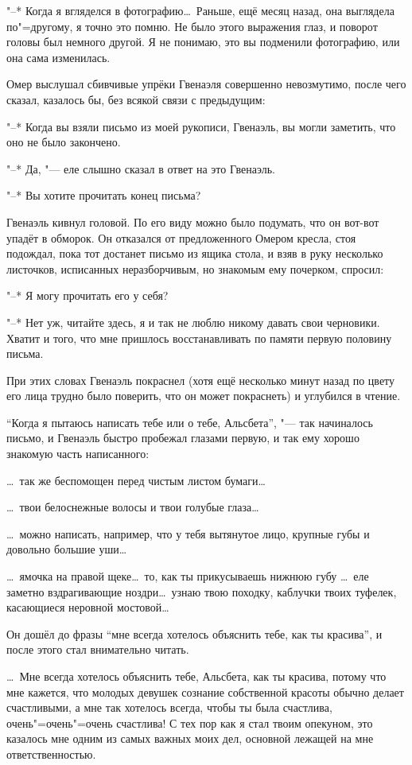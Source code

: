 "--* Когда я вгляделся в фотографию\ldots\
Раньше, ещё месяц назад, она выглядела по"=другому, я точно это помню.
Не было этого выражения глаз, и поворот головы был немного другой.
Я не понимаю, это вы подменили фотографию, или она сама изменилась.

Омер выслушал сбивчивые упрёки Гвенаэля совершенно невозмутимо, после чего
сказал, казалось бы, без всякой связи с предыдущим:

"--* Когда вы взяли письмо из моей рукописи, Гвенаэль, вы могли заметить, что
оно не было закончено.

"--* Да, "--- еле слышно сказал в ответ на это Гвенаэль.

"--* Вы хотите прочитать конец письма?

Гвенаэль кивнул головой.
По его виду можно было подумать, что он вот-вот упадёт в обморок.
Он отказался от предложенного Омером кресла, стоя подождал, пока тот достанет
письмо из ящика стола, и взяв в руку несколько листочков, исписанных
неразборчивым, но знакомым ему почерком, спросил:

"--* Я могу прочитать его у себя?

"--* Нет уж, читайте здесь, я и так не люблю никому давать свои черновики.
Хватит и того, что мне пришлось восстанавливать по памяти первую половину письма.

При этих словах Гвенаэль покраснел (хотя ещё несколько минут назад по цвету его
лица трудно было поверить, что он может покраснеть) и углубился в чтение.

\enquote{Когда я пытаюсь написать тебе или о тебе, Альсбета}, "--- так начиналось
письмо, и Гвенаэль быстро пробежал глазами первую, и так ему хорошо знакомую
часть написанного:

\ldots\ так же беспомощен перед чистым листом бумаги\ldots

\ldots\ твои белоснежные волосы и твои голубые глаза\ldots

\ldots\ можно написать, например, что у тебя вытянутое лицо, крупные губы и
довольно большие уши\ldots

\ldots\ ямочка на правой щеке\ldots\ то, как ты прикусываешь нижнюю губу
\ldots\ еле заметно вздрагивающие ноздри\ldots\ узнаю твою походку, каблучки
твоих туфелек, касающиеся неровной мостовой\ldots

Он дошёл до фразы \enquote{мне всегда хотелось объяснить тебе, как ты красива},
и после этого стал внимательно читать.

\medskip
\ldots\ Мне всегда хотелось объяснить тебе, Альсбета, как ты красива, потому что
мне кажется, что молодых девушек сознание собственной красоты обычно делает
счастливыми, а мне так хотелось всегда, чтобы ты была счастлива,
очень"=очень"=очень счастлива!
С тех пор как я стал твоим опекуном, это казалось мне одним из самых важных моих
дел, основной лежащей на мне ответственностью.

